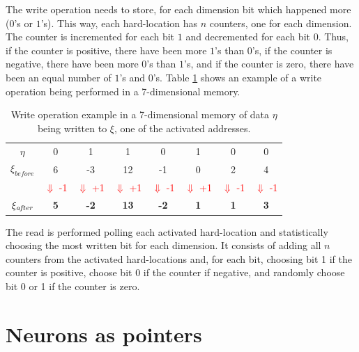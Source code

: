The write operation needs to store, for each dimension bit which happened more ($0$'s or $1$'s). This way, each hard-location has $n$ counters, one for each dimension. The counter is incremented for each bit $1$ and decremented for each bit $0$. Thus, if the counter is positive, there have been more $1$'s than $0$'s, if the counter is negative, there have been more $0$'s than $1$'s, and if the counter is zero, there have been an equal number of $1$'s and $0$'s. Table \ref{tab:write operation} shows an example of a write operation being performed in a 7-dimensional memory.

\begin{table}
\begin{tabular}{c|c|c|c|c|c|c|c|}
\cline{2-8}
$\eta$ & 0 & 1 & 1 & 0 & 1 & 0 & 0\tabularnewline
\cline{2-8}
$\xi_{\textit{before}}$ & 6 & -3 & 12 & -1 & 0 & 2 & 4\tabularnewline
\cline{2-8}
\multicolumn{1}{c}{} & \multicolumn{1}{c}{\textcolor{red}{\small{}$\Downarrow$ -1}} & \multicolumn{1}{c}{\textcolor{red}{\small{}$\Downarrow$ +1}} & \multicolumn{1}{c}{\textcolor{red}{\small{}$\Downarrow$ +1}} & \multicolumn{1}{c}{\textcolor{red}{\small{}$\Downarrow$ -1}} & \multicolumn{1}{c}{\textcolor{red}{\small{}$\Downarrow$ +1}} & \multicolumn{1}{c}{\textcolor{red}{\small{}$\Downarrow$ -1}} & \multicolumn{1}{c}{\textcolor{red}{\small{}$\Downarrow$ -1}}\tabularnewline
\cline{2-8}
$\xi_{\textit{\textit{after}}}$ & \textbf{5} & \textbf{-2} & \textbf{13} & \textbf{-2} & \textbf{1} & \textbf{1} & \textbf{3}\tabularnewline
\cline{2-8}
\end{tabular}

\caption{Write operation example in a 7-dimensional memory of data $\eta$
being written to $\xi$, one of the activated addresses.\label{tab:write operation}}


\end{table}


The read is performed polling each activated hard-location and statistically choosing the most written bit for each dimension. It consists of adding all $n$ counters from the activated hard-locations and, for each bit, choosing bit 1 if the counter is positive, choose bit 0 if the counter if negative, and randomly choose bit 0 or 1 if the counter is zero.


\section{Neurons as pointers}

